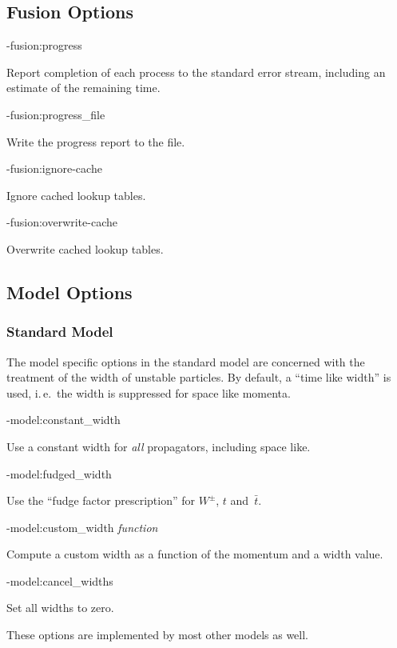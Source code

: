 \documentclass[12pt,a4paper]{article}
\newenvironment{options}%
 {\begin{list}{}%
   {\setlength{\leftmargin}{3em}%
    \setlength{\rightmargin}{3em}%
    \setlength{\itemindent}{1em}%
    \setlength{\listparindent}{0pt}%
    \settowidth{\labelwidth}{5em}%
    \renewcommand{\makelabel}[1]{\texttt{##1}}}}%
 {\end{list}}
\begin{document}
\subsection{Fusion Options}
\begin{options}
  \item[-fusion:progress]\hfil\par
    Report completion of each process to the standard error stream,
    including an estimate of the remaining time.
  \item[-fusion:progress\_file] \par
    Write the progress report to the file.
  \item[-fusion:ignore-cache]\hfil\par
    Ignore cached lookup tables.
  \item[-fusion:overwrite-cache]\hfil\par
    Overwrite cached lookup tables.
\end{options}
\subsection{Model Options}
\subsubsection{Standard Model}
The model specific options in the standard model are concerned with
the treatment of the width of unstable particles.  By default, a
``time like width'' is used, i.\,e.~the width is suppressed for space
like momenta.
\begin{options}
  \item[-model:constant\_width]\hfil\par
    Use a constant width for \emph{all} propagators, including space
    like.
  \item[-model:fudged\_width]\hfil\par
    Use the ``fudge factor prescription''\cite{FudgedWidth} for
    $W^\pm$, $t$ and~$\bar t$.
  \item[-model:custom\_width] \textit{function}\par
    Compute a custom width as a function of the  momentum and a width
    value. 
  \item[-model:cancel\_widths] \hfil\par
    Set all widths to zero.
\end{options}
These options are implemented by most other models as well.
\end{document}
